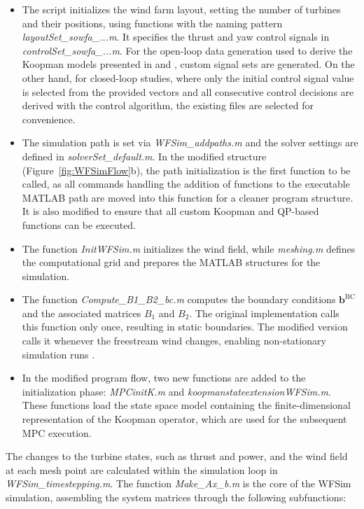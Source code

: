 \begin{itemize}\item The script initializes the wind farm layout, setting the number of turbines and their positions, using functions with the naming pattern \textit{layoutSet\_sowfa\_...m}. It specifies the thrust and yaw control signals in \textit{controlSet\_sowfa\_...m}. For the open-loop data generation used to derive the Koopman models presented in \cite{sharan2022Koopman} and \cite{dittmer2022data}, custom signal sets are generated. On the other hand, for closed-loop studies, where only the initial control signal value is selected from the provided vectors and all consecutive control decisions are derived with the control algorithm, the existing files are selected for convenience.
    
    \item The simulation path is set via \textit{WFSim\_addpaths.m} and the solver settings are defined in \textit{solverSet\_default.m}. In the modified structure (Figure~\ref{fig:WFSimFlow}b), the path initialization is the first function to be called, as all commands handling the addition of functions to the executable MATLAB path are moved into this function for a cleaner program structure. It is also modified to ensure that all custom Koopman and QP-based functions can be executed.
    
    \item The function \textit{InitWFSim.m} initializes the wind field, while \textit{meshing.m} defines the computational grid and prepares the MATLAB structures for the simulation.
    
    \item The function \textit{Compute\_B1\_B2\_bc.m} computes the boundary conditions $\bm{b}^\mathrm{BC}$ and the associated matrices $B_1$ and $B_2$. The original implementation calls this function only once, resulting in static boundaries. The modified version calls it whenever the freestream wind changes, enabling non-stationary simulation runs \cite{dittmer2022data}.
    
    \item In the modified program flow, two new functions are added to the initialization phase: \textit{MPCinitK.m} and \textit{koopmanstateextensionWFSim.m}. These functions load the state space model containing the finite-dimensional representation of the Koopman operator, which are used for the subsequent MPC execution.
\end{itemize}
The changes to the turbine states, such as thrust and power, and the wind field at each mesh point are calculated within the simulation loop in \textit{WFSim\_timestepping.m}. The function \textit{Make\_Ax\_b.m} is the core of the WFSim simulation, assembling the system matrices through the following subfunctions:

